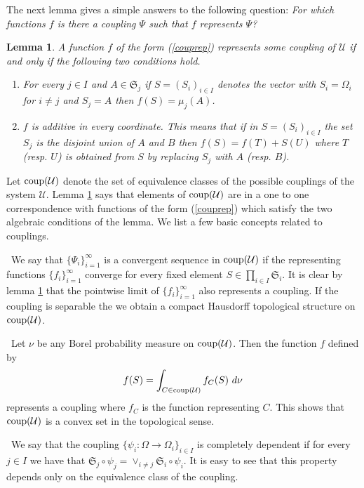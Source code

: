 \documentclass [11pt] {article}
\newtheorem{lemma}{Lemma}[section]
\begin{document}
The next lemma gives a simple answers to the following question: {\it For which functions $f$ is there a coupling $\Psi$ such that $f$ represents $\Psi$?}

\begin{lemma}\label{couprepl} A function $f$ of the form (\ref{couprep}) represents some coupling of $\mathcal{U}$ if and only if the following two conditions hold.
\begin{enumerate}
\item For every $j\in I$ and $A\in\mathfrak{S}_j$ if $S=(S_i)_{i\in I}$ denotes the vector with $S_i=\Omega_i$ for $i\neq j$ and $S_j=A$  then $f(S)=\mu_j(A)$.
\item $f$ is additive in every coordinate. This means that if in $S=(S_i)_{i\in I}$ the set $S_j$ is the disjoint union of $A$ and $B$ then $f(S)=f(T)+S(U)$ where $T$ (resp. $U$) is obtained from $S$ by replacing $S_j$ with $A$ (resp. $B$).
\end{enumerate}  
\end{lemma} 

Let ${\rm coup}(\mathcal{U})$ denote the set of equivalence classes of the possible couplings of the system $\mathcal{U}$.
Lemma \ref{couprepl} says that elements of ${\rm coup}(\mathcal{U})$ are in a one to one correspondence with functions of the form (\ref{couprep}) which satisfy the two algebraic conditions of the lemma. 
We list a few basic concepts related to couplings.

\bigskip

~We say that $\{\Psi_i\}_{i=1}^\infty$ is a convergent sequence in ${\rm coup}(\mathcal{U})$ if the representing functions $\{f_i\}_{i=1}^\infty$ converge for every fixed element $S\in\prod_{i\in I}\mathfrak{S}_i$. It is clear by lemma \ref{couprepl} that the pointwise limit of $\{f_i\}_{i=1}^\infty$ also represents a coupling. If the coupling is separable the we obtain a compact Hausdorff topological structure on ${\rm coup}(\mathcal{U})$. 

\bigskip 

~Let $\nu$ be any Borel probability measure on ${\rm coup}(\mathcal{U})$. Then the function $f$ defined by
$$f(S)=\int_{C\in {\rm coup}(\mathcal{U})} f_C(S)~d\nu$$ represents a coupling where $f_C$ is the function representing $C$. This shows that ${\rm coup}(\mathcal{U})$ is a convex set in the topological sense.

\bigskip


~We say that the coupling $\{\psi_i:\Omega\rightarrow\Omega_i\}_{i\in I}$ is completely dependent if for every $j\in I$ we have that $\mathfrak{S}_j\circ\psi_j=\vee_{i\neq j}\mathfrak{S}_i\circ\psi_i$. It is easy to see that this property depends only on the equivalence class of the coupling.
\end{document}

